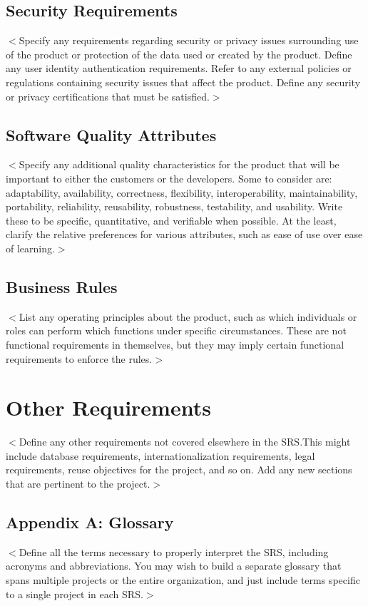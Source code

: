 \documentclass{scrreprt}
\begin{document}
\section{Security Requirements}
$<$Specify any requirements regarding security or privacy issues surrounding use 
of the product or protection of the data used or created by the product. Define 
any user identity authentication requirements. Refer to any external policies or 
regulations containing security issues that affect the product. Define any 
security or privacy certifications that must be satisfied.$>$

\section{Software Quality Attributes}
$<$Specify any additional quality characteristics for the product that will be 
important to either the customers or the developers. Some to consider are: 
adaptability, availability, correctness, flexibility, interoperability, 
maintainability, portability, reliability, reusability, robustness, testability, 
and usability. Write these to be specific, quantitative, and verifiable when 
possible. At the least, clarify the relative preferences for various attributes, 
such as ease of use over ease of learning.$>$

\section{Business Rules}
$<$List any operating principles about the product, such as which individuals or 
roles can perform which functions under specific circumstances. These are not 
functional requirements in themselves, but they may imply certain functional 
requirements to enforce the rules.$>$

\chapter{Other Requirements}
$<$Define any other requirements not covered elsewhere in the SRS.\@ This might 
include database requirements, internationalization requirements, legal 
requirements, reuse objectives for the project, and so on. Add any new sections 
that are pertinent to the project.$>$

\section{Appendix A: Glossary}
$<$Define all the terms necessary to properly interpret the SRS, including 
acronyms and abbreviations. You may wish to build a separate glossary that spans 
multiple projects or the entire organization, and just include terms specific to 
a single project in each SRS.$>$
\end{document}
